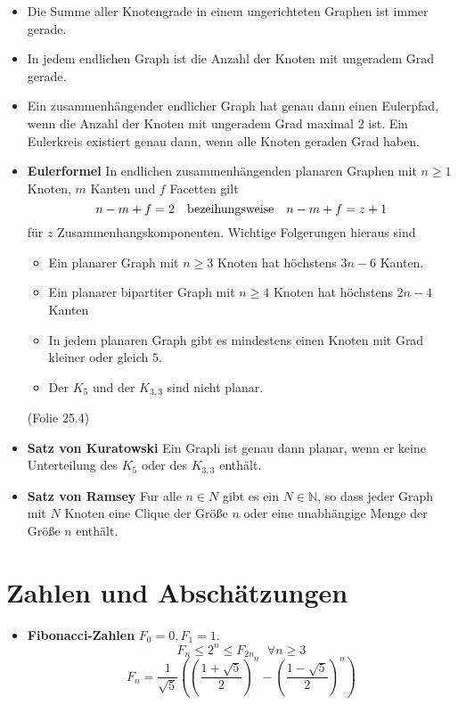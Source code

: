 \documentclass[landscape, 8pt, a4paper]{extarticle}
\newcommand{\N}{\mathbb{N}}
\begin{document}
\begin{multicols}{3}
	\begin{itemize}
		\item Die Summe aller Knotengrade in einem ungerichteten Graphen ist immer gerade.
		\item In jedem endlichen Graph ist die Anzahl der Knoten mit ungeradem Grad gerade.
		\item Ein zusammenhängender endlicher Graph hat genau dann einen Eulerpfad, wenn die Anzahl der Knoten mit ungeradem Grad maximal 2 ist. Ein Eulerkreis existiert genau dann, wenn alle Knoten geraden Grad haben.
		\item \textbf{Eulerformel} In endlichen zusammenhängenden planaren Graphen mit $n\geq 1$ Knoten, $m$ Kanten und $f$ Facetten gilt
		\begin{equation*}
			n-m+f=2\text{\quad bezeihungsweise\quad}n-m+f=z+1
		\end{equation*}
		für $z$ Zusammenhangskomponenten.
		Wichtige Folgerungen hieraus sind
		\begin{itemize}
			\item Ein planarer Graph mit $n\geq 3$ Knoten hat höchstens $3n-6$ Kanten.
			\item Ein planarer bipartiter Graph mit $n\geq 4$ Knoten hat höchstens $2n-4$ Kanten
			\item In jedem planaren Graph gibt es mindestens einen Knoten mit Grad kleiner oder gleich $5$.
			\item Der $K_5$ und der $K_{3,3}$ sind nicht planar.
		\end{itemize} (Folie 25.4)

		\item \textbf{Satz von Kuratowski} Ein Graph ist genau dann planar, wenn er keine Unterteilung des $K_5$ oder des $K_{3,3}$ enthält.

		\item \textbf{Satz von Ramsey} Fur alle $n\in N$ gibt es ein $N\in\N$, so dass jeder Graph mit $N$ Knoten eine Clique der Größe $n$ oder eine unabhängige Menge der Größe $n$ enthält.
	\end{itemize}



	\section{Zahlen und Abschätzungen}
	\begin{itemize}
		\item \textbf{Fibonacci-Zahlen} $F_0=0, F_1=1$. 
		\begin{equation*}
			F_{n}\leq 2^n\leq F_{2n}\quad \forall n\geq 3
		\end{equation*}
		\begin{equation*}
			F_n=\frac{1}{\sqrt 5}\left(\left(\frac{1+\sqrt 5}{2}\right)^n-\left(\frac{1-\sqrt 5}{2}\right)^n\right)
		\end{equation*}


\end{itemize}
\end{multicols}
\end{document}
